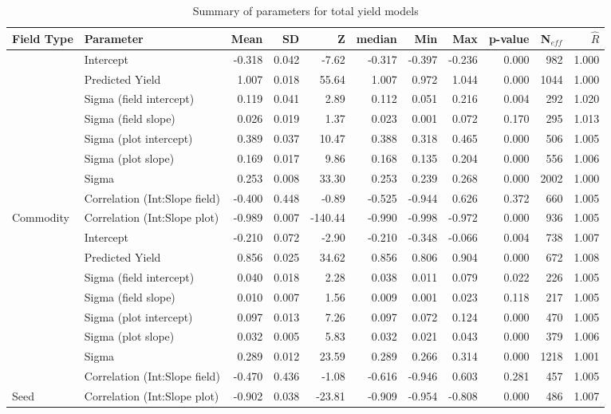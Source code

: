 \begin{table}[h]
\centering\begingroup\fontsize{9}{11}\selectfont
\caption{Summary of parameters for total yield models}

\begin{tabular}{l|l|r|r|r|r|r|r|r|r|r}
\hline
Field Type & Parameter & Mean & SD & Z & median & Min & Max & p-value & N$_{eff}$ & $\hat{R}$\\
\hline
 & Intercept & -0.318 & 0.042 & -7.62 & -0.317 & -0.397 & -0.236 & 0.000 & 982 & 1.000\\
\cline{2-11}
 & Predicted Yield & 1.007 & 0.018 & 55.64 & 1.007 & 0.972 & 1.044 & 0.000 & 1044 & 1.000\\
\cline{2-11}
 & Sigma (field intercept) & 0.119 & 0.041 & 2.89 & 0.112 & 0.051 & 0.216 & 0.004 & 292 & 1.020\\
\cline{2-11}
 & Sigma (field slope) & 0.026 & 0.019 & 1.37 & 0.023 & 0.001 & 0.072 & 0.170 & 295 & 1.013\\
\cline{2-11}
 & Sigma (plot intercept) & 0.389 & 0.037 & 10.47 & 0.388 & 0.318 & 0.465 & 0.000 & 506 & 1.005\\
\cline{2-11}
 & Sigma (plot slope) & 0.169 & 0.017 & 9.86 & 0.168 & 0.135 & 0.204 & 0.000 & 556 & 1.006\\
\cline{2-11}
 & Sigma & 0.253 & 0.008 & 33.30 & 0.253 & 0.239 & 0.268 & 0.000 & 2002 & 1.000\\
\cline{2-11}
 & Correlation (Int:Slope field) & -0.400 & 0.448 & -0.89 & -0.525 & -0.944 & 0.626 & 0.372 & 660 & 1.005\\
\cline{2-11}
\multirow{-9}{*}{\raggedright\arraybackslash Commodity} & Correlation (Int:Slope plot) & -0.989 & 0.007 & -140.44 & -0.990 & -0.998 & -0.972 & 0.000 & 936 & 1.005\\
\cline{1-11}
 & Intercept & -0.210 & 0.072 & -2.90 & -0.210 & -0.348 & -0.066 & 0.004 & 738 & 1.007\\
\cline{2-11}
 & Predicted Yield & 0.856 & 0.025 & 34.62 & 0.856 & 0.806 & 0.904 & 0.000 & 672 & 1.008\\
\cline{2-11}
 & Sigma (field intercept) & 0.040 & 0.018 & 2.28 & 0.038 & 0.011 & 0.079 & 0.022 & 226 & 1.005\\
\cline{2-11}
 & Sigma (field slope) & 0.010 & 0.007 & 1.56 & 0.009 & 0.001 & 0.023 & 0.118 & 217 & 1.005\\
\cline{2-11}
 & Sigma (plot intercept) & 0.097 & 0.013 & 7.26 & 0.097 & 0.072 & 0.124 & 0.000 & 470 & 1.005\\
\cline{2-11}
 & Sigma (plot slope) & 0.032 & 0.005 & 5.83 & 0.032 & 0.021 & 0.043 & 0.000 & 379 & 1.006\\
\cline{2-11}
 & Sigma & 0.289 & 0.012 & 23.59 & 0.289 & 0.266 & 0.314 & 0.000 & 1218 & 1.001\\
\cline{2-11}
 & Correlation (Int:Slope field) & -0.470 & 0.436 & -1.08 & -0.616 & -0.946 & 0.603 & 0.281 & 457 & 1.005\\
\cline{2-11}
\multirow{-9}{*}{\raggedright\arraybackslash Seed} & Correlation (Int:Slope plot) & -0.902 & 0.038 & -23.81 & -0.909 & -0.954 & -0.808 & 0.000 & 486 & 1.007\\
\hline
\end{tabular}
\label{tab:totalYieldCoefs}
\endgroup{}
\end{table}